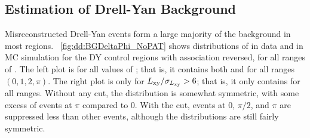 \subsection{Estimation of Drell-Yan Background}
\label{sec:dd:bgest-DY}
Misreconstructed Drell-Yan events form a large majority of the background in most regions.
\Fig~\ref{fig:dd:BGDeltaPhi_NoPAT} shows distributions of \DeltaPhi in data and in MC simulation for the DY control regions with \DSAToPAT association reversed, for all ranges of \DeltaPhi.
The left plot is for all values of \LxySig; that is, it contains both  and  for all \DeltaPhi ranges $(0, 1, 2, \pi)$.
The right plot is only for $L_{\mathrm{xy}}/\sigma_{L_{\mathrm{xy}}} > 6$; that is, it only contains  for all \DeltaPhi ranges.
Without any \LxySig cut, the distribution is somewhat symmetric, with some excess of events at $\pi$ compared to 0.
With the \LxySig cut, events at 0, $\pi/2$, and $\pi$ are suppressed less than other events, although the distributions are still fairly symmetric.

